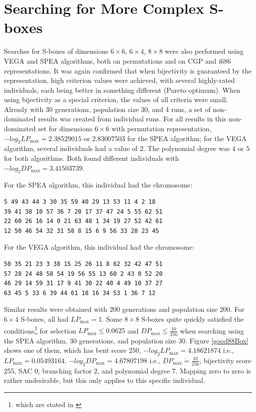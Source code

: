 \section{Searching for More Complex S-boxes}
Searches for S-boxes of dimensions $6 \times 6$, $6 \times 4$, $8 \times 8$ were also performed using VEGA
and SPEA algorithms, both on permutations and on CGP and i686 representations.
It was again confirmed that when bijectivity is guaranteed by the representation, high criterion values were achieved, with
several highly-rated individuals, each being better in something different (Pareto optimum).
When using bijectivity as a special criterion, the values of all criteria were small.
Already with 30 generations, population size 30, and 4 runs, a set of non-dominated
results was created from individual runs.
For all results in this non-dominated set for dimensions $6 \times 6$ with
permutation representation, $-log_2{LP_{\max}} = 2.38529015$ or $2.83007503$ for the SPEA
algorithm; for the VEGA algorithm, several individuals had a value of $2$. The polynomial degree was $4$ or $5$ for both
algorithms. Both found different individuals with $-log_2{DP_{\max}} = 3.41503739$.
\begin{center}
\begin{minipage}{0.6\textwidth}
For the SPEA algorithm, this individual had the chromosome:
\begin{verbatim}
5 49 43 44 3 30 35 59 40 29 13 53 11 4 2 18
39 41 38 10 57 36 7 20 17 37 47 24 5 55 62 51
22 60 26 16 14 0 21 63 48 1 34 19 27 52 42 61
12 50 46 54 32 31 58 8 15 6 9 56 33 28 23 45
\end{verbatim}

For the VEGA algorithm, this individual had the chromosome:
\begin{verbatim}
50 35 21 23 3 38 15 25 26 11 8 62 32 42 47 51
57 28 24 48 58 54 19 56 55 13 60 2 43 0 52 20
46 29 14 59 31 17 9 41 30 22 40 4 49 10 37 27
63 45 5 33 6 39 44 61 18 16 34 53 1 36 7 12
\end{verbatim}
\end{minipage}
\end{center}

Similar results were obtained with 200 generations and population size 200.
For $6 \times 4$ S-boxes, all had $LP_{\max} = 1$.
Some $8 \times 8$ S-boxes quite quickly satisfied the conditions\footnote{which are stated in \cite{twofish}}
for selection $LP_{\max} \leq  0.0625$ and
$DP_{\max} \leq  \frac{10}{256}$
when searching using the SPEA algorithm, 30 generations, and population size 30.
Figure \ref{good88Box} shows one of them, which has
bent score 250,
$-log_2{LP_{\max}} = 4.18621874$ i.e., $LP_{\max} = 0.05493164$,
$-log_2{DP_{\max}} = 4.67807198$ i.e., $DP_{\max} \dot{=} \frac{10}{256}$,
bijectivity score 255,
SAC 0,
branching factor 2,
and polynomial degree 7.
Mapping zero to zero is rather undesirable, but this only applies to this specific individual.

